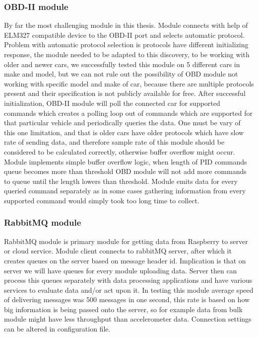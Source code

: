 \subsubsection{OBD-II module} %
By far the most challenging module in this thesis. Module connects with help of ELM327 compatible device to the OBD-II port and selects automatic protocol. Problem with automatic protocol selection is protocols have different initializing response, the module needed to be adapted to this discovery, to be working with older and newer cars, we successfully tested this module on 5 different cars in make and model, but we can not rule out the possibility of OBD module not working with specific model and make of car, because there are multiple protocols present and their specification is not publicly available for free. After successful initialization, OBD-II module will poll the connected car for supported commands which creates a polling loop out of commands which are supported for that particular vehicle and periodically queries the data. One must be vary of this one limitation, and that is older cars have older protocols which have slow rate of sending data, and therefore sample rate of this module should be considered to be calculated correctly, otherwise buffer overflow might occur. Module implements simple buffer overflow logic, when length of PID commands queue becomes more than threshold OBD module will not add more commands to queue until the length lowers than threshold. Module emits data for every queried command separately as in some cases gathering information from every supported command would simply took too long time to collect.
\label{ssub:obd_ii_module}

\subsubsection{RabbitMQ module} %
\label{ssub:rabbitmq_module}
RabbitMQ module is primary module for getting data from Raspberry to server or cloud service. Module client connects to rabbitMQ server, after which it creates queues on the server based on message header id. Implication is that on server we will have queues for every module uploading data. Server then can process this queues separately with data processing applications and have various services to evaluate data and/or act upon it. In testing this module average speed of delivering messages was 500 messages in one second, this rate is based on how big information is being passed onto the server, so for example data from bulk module might have less throughput than accelerometer data. Connection settings can be altered in configuration file.
